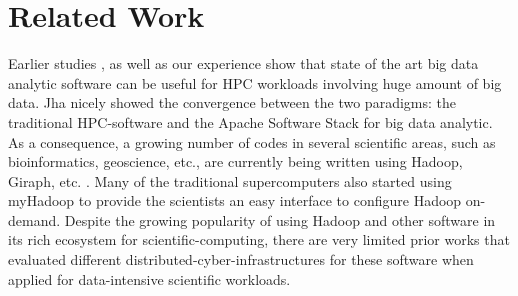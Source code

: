 \documentclass[conference]{IEEEtran}
\begin{document}
\section {Related Work} \label{Related Work}
Earlier studies \cite{schadoop:fadika} \cite{schadoop:jha}, as well as our experience show that state of the art big data analytic software can be useful for HPC workloads involving huge amount of big data. 
Jha \cite{schadoop:jha} nicely showed the convergence between the two paradigms: the traditional HPC-software and the Apache Software Stack for big data analytic. 
As a consequence, a growing number of codes in several scientific areas, such as bioinformatics, geoscience, etc., are currently being written using Hadoop, Giraph, etc. \cite{fw:myhadoop}. 
Many of the traditional supercomputers also started using myHadoop \cite{fw:myhadoop} to provide the scientists an easy interface to configure Hadoop on-demand. 
Despite the growing popularity of using Hadoop and other software in its rich ecosystem for scientific-computing, there are very limited prior works that evaluated different distributed-cyber-infrastructures for these software when applied for data-intensive scientific workloads.

\end{document}
